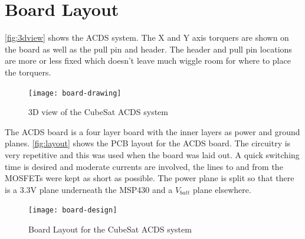 \section{Board Layout}

\autoref{fig:3dview} shows the \ac{ACDS} system. The X and Y axis torquers are shown on the board as well as the pull pin and header. The header and pull pin locations are more or less fixed which doesn't leave much wiggle room for where to place the torquers.

\begin{figure}[H]
    \centering
    \texttt{[image: board-drawing]}
    \caption{3D view of the CubeSat \acs{ACDS} system}
    \label{fig:3dview}
\end{figure}

The \ac{ACDS} board is a four layer board with the inner layers as power and ground planes. \autoref{fig:layout} shows the \ac{PCB} layout for the \ac{ACDS} board. The circuitry is very repetitive and this was used when the board was laid out. A quick switching time is desired and moderate currents are involved, the lines to and from the \acp{MOSFET} were kept as short as possible. The power plane is split so that there is a 3.3V plane underneath the MSP430 and a $V_{batt}$ plane elsewhere.

\begin{figure}[H]
    \centering
    \texttt{[image: board-design]}
    \caption{Board Layout for the CubeSat \acs{ACDS} system}
    \label{fig:layout}
\end{figure}

